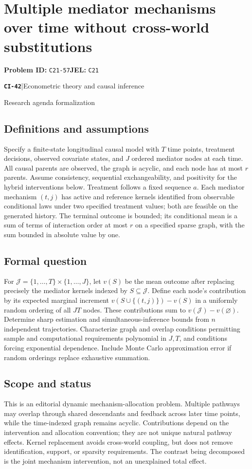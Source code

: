 \documentclass[11pt,a4paper]{article}
\newcommand{\entrymeta}[3]{{\sffamily\small\color{muted}\textbf{\texttt{#1}}\quad|\quad #2\par #3\par}}
\begin{document}
\section*{Multiple mediator mechanisms over time without cross-world substitutions}
\textbf{Problem ID:} \texttt{C21-57}\quad \textbf{JEL:} \texttt{C21}\par
\label{problem:OP-0521}
\label{beyond:CI-42}
\entrymeta{CI-42}{Econometric theory and causal inference}{Research agenda formalization}
\subsection*{Definitions and assumptions}
Specify a finite-state longitudinal causal model with $T$ time points, treatment decisions, observed covariate states, and $J$ ordered mediator nodes at each time. All causal parents are observed, the graph is acyclic, and each node has at most $r$ parents. Assume consistency, sequential exchangeability, and positivity for the hybrid interventions below. Treatment follows a fixed sequence $a$. Each mediator mechanism $(t,j)$ has active and reference kernels identified from observable conditional laws under two specified treatment values; both are feasible on the generated history. The terminal outcome is bounded; its conditional mean is a sum of terms of interaction order at most $r$ on a specified sparse graph, with the sum bounded in absolute value by one.
\subsection*{Formal question}
For $\mathcal J=\{1,\ldots,T\}\times\{1,\ldots,J\}$, let $v(S)$ be the mean outcome after replacing precisely the mediator kernels indexed by $S\subseteq\mathcal J$. Define each node's contribution by its expected marginal increment $v(S\cup\{(t,j)\})-v(S)$ in a uniformly random ordering of all $JT$ nodes. These contributions sum to $v(\mathcal J)-v(\varnothing)$. Determine sharp estimation and simultaneous-inference bounds from $n$ independent trajectories. Characterize graph and overlap conditions permitting sample and computational requirements polynomial in $J,T$, and conditions forcing exponential dependence. Include Monte Carlo approximation error if random orderings replace exhaustive summation.
\subsection*{Scope and status}
This is an editorial dynamic mechanism-allocation problem. Multiple pathways may overlap through shared descendants and feedback across later time points, while the time-indexed graph remains acyclic. Contributions depend on the intervention and allocation convention; they are not unique natural pathway effects. Kernel replacement avoids cross-world coupling, but does not remove identification, support, or sparsity requirements. The contrast being decomposed is the joint mechanism intervention, not an unexplained total effect.
\end{document}
